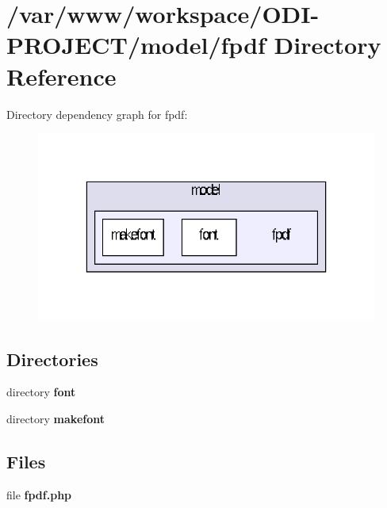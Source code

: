 \section{/var/www/workspace/\+O\+D\+I-\/\+P\+R\+O\+J\+E\+C\+T/model/fpdf Directory Reference}
\label{dir_edf02ae1f831f47683c683f30985c06f}
Directory dependency graph for fpdf\+:\nopagebreak
\begin{figure}[H]
\begin{center}
\leavevmode
\includegraphics[width=332pt]{dir_edf02ae1f831f47683c683f30985c06f_dep}
\end{center}
\end{figure}
\subsection*{Directories}
\begin{DoxyCompactItemize}
\item 
directory {\bf font}
\item 
directory {\bf makefont}
\end{DoxyCompactItemize}
\subsection*{Files}
\begin{DoxyCompactItemize}
\item 
file {\bfseries fpdf.\+php}
\end{DoxyCompactItemize}
